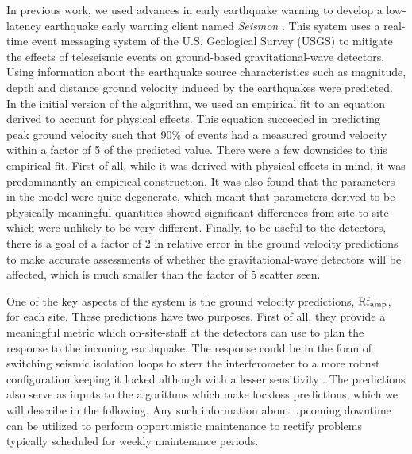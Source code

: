 \documentclass[reprint, prl, aps, showpacs]{revtex4-1}
\begin{document}
In previous work, we used advances in early earthquake warning to develop a low-latency earthquake early warning client named \emph{Seismon} \cite{CoEa2017}. This system uses a real-time event messaging system of the U.S. Geological Survey (USGS) to mitigate the effects of teleseismic events on ground-based gravitational-wave detectors. 
Using information about the earthquake source characteristics such as magnitude, depth and distance ground velocity induced by the earthquakes were predicted.
In the initial version of the algorithm, we used an empirical fit to an equation derived to account for physical effects. This equation succeeded in predicting peak ground velocity such that 90\% of events had a measured ground velocity within a factor of 5 of the predicted value.
There were a few downsides to this empirical fit.
First of all, while it was derived with physical effects in mind, it was predominantly an empirical construction.
It was also found that the parameters in the model were quite degenerate, which meant that parameters derived to be physically meaningful quantities showed significant differences from site to site which were unlikely to be very different. Finally, to be useful to the detectors, there is a goal of a factor of 2 in relative error in the ground velocity predictions to make accurate assessments of whether the gravitational-wave detectors will be affected, which is much smaller than the factor of 5 scatter seen. 

One of the key aspects of the system is the ground velocity predictions, $\rm Rf_{amp}$, for each site. These predictions have two purposes. 
First of all, they provide a meaningful metric which on-site-staff at the detectors can use to plan the response to the incoming earthquake. The response could be in the form of switching seismic isolation loops to steer the interferometer to a more robust configuration keeping it locked although with a lesser sensitivity \cite{BiWa2018}. The predictions also serve as inputs to the algorithms which make lockloss predictions, which we will describe in the following. Any such information about upcoming downtime can be utilized to perform opportunistic maintenance to rectify problems typically scheduled for weekly maintenance periods.
\end{document}
